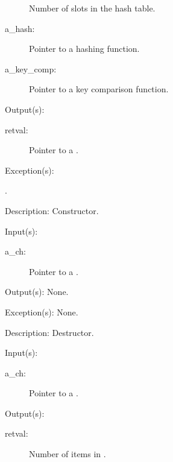 \begin{capi}
\begin{capilist}
\begin{description}
			Number of slots in the hash table.
		\item[a\_hash: ]
			Pointer to a hashing function.
		\item[a\_key\_comp: ]
			Pointer to a key comparison function.
		\end{description}
	\item[Output(s): ]
		\begin{description}\item[]
		\item[retval: ]
			Pointer to a .
		\end{description}
	\item[Exception(s): ]
		\begin{description}\item[]
		\item[.]
		\end{description}
	\item[Description: ]
		Constructor.
	\end{capilist}
\label{ch_delete}
	\begin{capilist}
	\item[Input(s): ]
		\begin{description}\item[]
		\item[a\_ch: ]
			Pointer to a .
		\end{description}
	\item[Output(s): ] None.
	\item[Exception(s): ] None.
	\item[Description: ]
		Destructor.
	\end{capilist}
\label{ch_count}
	\begin{capilist}
	\item[Input(s): ]
		\begin{description}\item[]
		\item[a\_ch: ]
			Pointer to a \classname{ch}.
		\end{description}
	\item[Output(s): ]
		\begin{description}\item[]
		\item[retval: ]
			Number of items in \cvar{a\_ch}.
		\end{description}

\end{capilist}
\end{capi}

